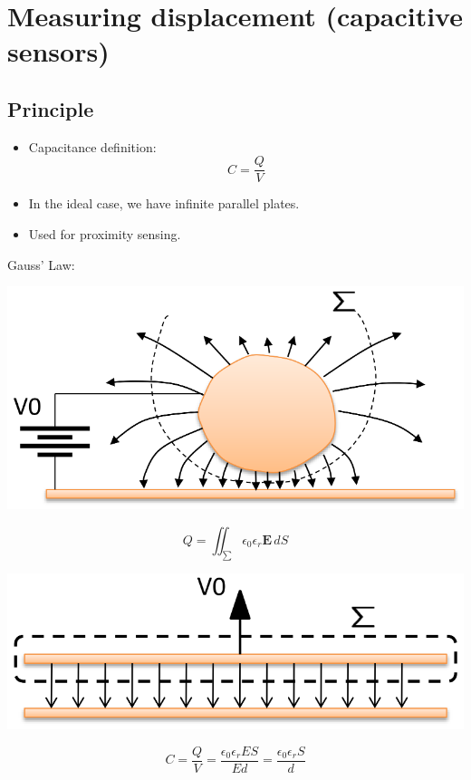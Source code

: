 \documentclass[11pt]{article}
\begin{document}
 \newpage
\section{Measuring displacement (capacitive sensors)}
\label{sec:org043845a}

\subsection{Principle}
\label{sec:orgfc08b96}
\begin{itemize}
\item Capacitance definition:
\[C = \frac{Q}{V}\]
\item In the ideal case, we have infinite parallel plates.
\item Used for proximity sensing.
\end{itemize}

Gauss' Law:
\begin{center}
\includegraphics[width=.9\linewidth]{./images/gauss-law-diagram.png}
\end{center}
\[Q = \iint_{\sum} \epsilon_0 \epsilon_r \boldsymbol{E} \, dS\]

\begin{center}
\includegraphics[width=.9\linewidth]{./images/infinite-parallel-plates-diagram.png}
\end{center}
\[C = \frac{Q}{V} = \frac{\epsilon_0 \epsilon_r ES}{Ed} = \frac{\epsilon_0 \epsilon_r S}{d}\]
\end{document}
